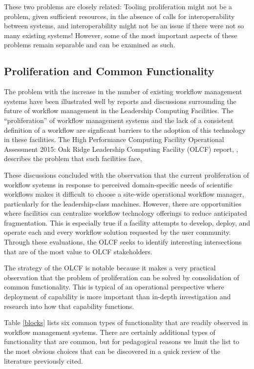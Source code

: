 These two problems are closely related: Tooling proliferation might not be a problem, given sufficient resources, in the absence of calls for interoperability between systems, and interoperability might not be an issue if there were not so many existing systems! However, some of the most important aspects of these problems remain separable and can be examined as such.

\subsection{Proliferation and Common Functionality}
\label{commonFunc}

The problem with the increase in the number of existing workflow management systems have been illustrated well by reports and discussions surrounding the future of workflow management in the Leadership Computing Facilities. The ``proliferation'' of workflow management systems and the lack of a consistent definition of a workflow are signficant barriers to the adoption of this technology in these facilities. The High Performance Computing Facility
Operational Assessment 2015: Oak Ridge Leadership Computing Facility (OLCF)
report, \cite{barker_scientific_2007}, describes the problem that such facilities
face,
\begin{displayquote}
These discussions concluded with the observation that the current proliferation
of workflow systems in response to perceived domain-specific needs of 
scientific workflows makes it difficult to choose a site-wide operational
workflow manager, particularly for the leadership-class machines. However,
there are opportunities where facilities can centralize workflow technology 
offerings to reduce anticipated fragmentation. This is especially true if a 
facility attempts to develop, deploy, and operate each and every workflow 
solution requested by the user community. Through these evaluations, the OLCF
seeks to identify interesting intersections that are of the most value to OLCF
stakeholders.
\end{displayquote}
The strategy of the OLCF is notable because it makes a very practical observation that the problem of proliferation can be solved by consolidation of common functionality. This is typical of an operational perspective where deployment of capability is more important than in-depth investigation and research into how that capability functions. 

Table \ref{blocks} lists six common types of functionality that are readily observed in workflow management systems. There are certainly additional types of functionality that are common, but for pedagogical reasons we limit the list to the most obvious choices that can be discovered in a quick review of the literature previously cited.

